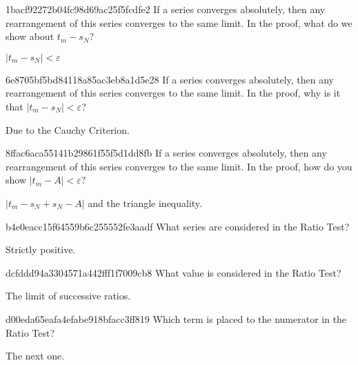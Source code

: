 \begin{note}{1bacf92272b04fc98d69ac25f5fcdfe2}
    If a series converges absolutely, then any rearrangement of this series converges to the same limit.
    In the proof, what do we show about \({ t_m - s_N }\)?

    \begin{cloze}{1}
        \({ \left\lvert t_m - s_N \right\rvert < \varepsilon }\)
    \end{cloze}
\end{note}

\begin{note}{6e8705bf5bd84118a85ac3eb8a1d5e28}
    If a series converges absolutely, then any rearrangement of this series converges to the same limit.
    In the proof, why is it that \({ \left\lvert t_m - s_N \right\rvert < \varepsilon }\)?

    \begin{cloze}{1}
        Due to the Cauchy Criterion.
    \end{cloze}
\end{note}

\begin{note}{8ffac6aca55141b29861f55f5d1dd8fb}
    If a series converges absolutely, then any rearrangement of this series converges to the same limit.
    In the proof, how do you show \({ \left\lvert t_m - A \right\rvert < \varepsilon }\)?

    \begin{cloze}{1}
        \({ \left\lvert t_m - s_N + s_N - A \right\rvert }\) and the triangle inequality.
    \end{cloze}
\end{note}

\begin{note}{b4e0eacc15f64559b6c255552fe3aadf}
    What series are considered in the Ratio Test?

    \begin{cloze}{1}
        Strictly positive.
    \end{cloze}
\end{note}

\begin{note}{dcfddd94a3304571a442fff1f7009cb8}
    What value is considered in the Ratio Test?

    \begin{cloze}{1}
        The limit of successive ratios.
    \end{cloze}
\end{note}

\begin{note}{d00eda65eafa4efabe918bfacc3ff819}
    Which term is placed to the numerator in the Ratio Test?

    \begin{cloze}{1}
        The next one.
    \end{cloze}
\end{note}

